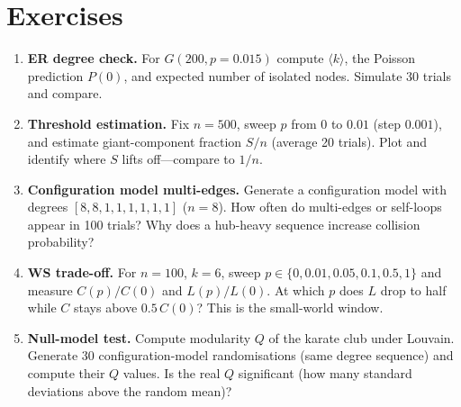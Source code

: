 \section{Exercises}
\label{sec:ch04-exercises}
\begin{enumerate}[label=E4.\arabic*, leftmargin=*, itemsep=0.8em]
    \item \textbf{ER degree check.} For $G(200, p=0.015)$ compute $\langle k\rangle$, the Poisson prediction $P(0)$, and expected number of isolated nodes. Simulate 30 trials and compare.
    \item \textbf{Threshold estimation.} Fix $n=500$, sweep $p$ from $0$ to $0.01$ (step $0.001$), and estimate giant-component fraction $S/n$ (average 20 trials). Plot and identify where $S$ lifts off---compare to $1/n$.
    \item \textbf{Configuration model multi-edges.} Generate a configuration model with degrees $[8,8,1,1,1,1,1,1]$ ($n=8$). How often do multi-edges or self-loops appear in 100 trials? Why does a hub-heavy sequence increase collision probability?
    \item \textbf{WS trade-off.} For $n=100$, $k=6$, sweep $p\in\{0,0.01,0.05,0.1,0.5,1\}$ and measure $C(p)/C(0)$ and $L(p)/L(0)$. At which $p$ does $L$ drop to half while $C$ stays above $0.5\,C(0)$? This is the small-world window.
    \item \textbf{Null-model test.} Compute modularity $Q$ of the karate club under Louvain. Generate 30 configuration-model randomisations (same degree sequence) and compute their $Q$ values. Is the real $Q$ significant (how many standard deviations above the random mean)?
\end{enumerate}
